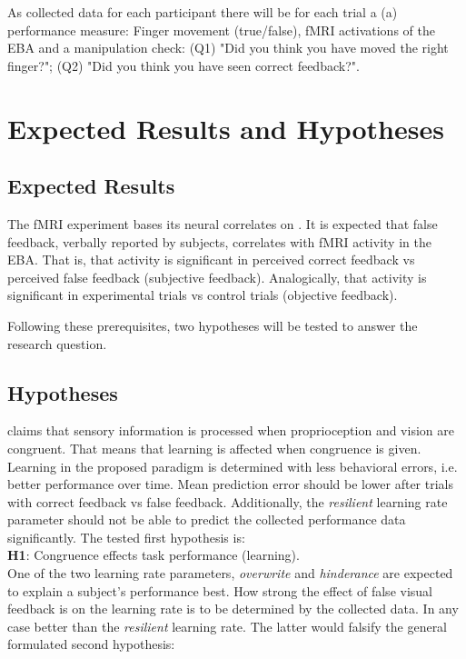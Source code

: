 \documentclass[man]{apa7}
\begin{document}
As collected data for each participant there will be for each trial a (a) performance measure: Finger movement (true/false), fMRI activations of the EBA and a manipulation check: (Q1) "Did you think you have moved the right finger?"; (Q2) "Did you think you have seen correct feedback?".

\section{Expected Results and Hypotheses}

\subsection{Expected Results}

The fMRI experiment bases its neural correlates on \parencite{Limanowski2016}. It is expected that false feedback, verbally reported by subjects, correlates with fMRI activity in the EBA. That is, that activity is significant in perceived correct feedback vs perceived false feedback (subjective feedback). Analogically, that activity is significant in experimental trials vs control trials (objective feedback).

Following these prerequisites, two hypotheses will be tested to answer the research question.

\subsection{Hypotheses}
\citeauthor{Limanowski2016} claims that sensory information is processed when proprioception and vision are congruent. That means that learning is affected when congruence is given. Learning in the proposed paradigm is determined with less behavioral errors, i.e. better performance over time. Mean prediction error should be lower after trials with correct feedback vs false feedback. Additionally, the \textit{resilient} learning rate parameter should not be able to predict the collected performance data significantly. The tested first hypothesis is:\\

\textbf{H1}: Congruence effects task performance (learning).\\

One of the two learning rate parameters, \textit{overwrite} and \textit{hinderance} are expected to explain a subject's performance best. How strong the effect of false visual feedback is on the learning rate is to be determined by the collected data. In any case better than the \textit{resilient} learning rate. The latter would falsify the general formulated second hypothesis: \\
\end{document}
